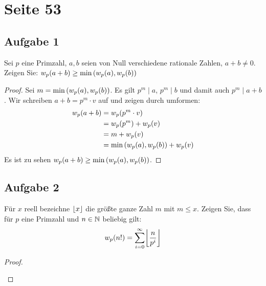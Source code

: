 \section{Seite 53}

\subsection{Aufgabe 1}
Sei $p$ eine Primzahl, $a,b$ seien von Null verschiedene rationale Zahlen,
$a + b \neq 0$. Zeigen Sie: $w_p(a + b) \geq \min{(w_p(a), w_p(b))}$
\begin{proof}
  Sei $m = \min{(w_p(a), w_p(b))}$. Es gilt $p^m \mid a$, $p^m \mid b$
  und damit auch $p^m \mid a + b$. Wir schreiben $a + b = p^m \cdot v$
  auf und zeigen durch umformen:
  \begin{align*}
    w_p(a + b) & = w_p(p^m \cdot v)                              \\
                      & = w_p(p^m) + w_p(v)                      \\
                      & = m + w_p(v)                                    \\
                      & = \min{(w_p(a), w_p(b))} + w_p(v)
  \end{align*}
  Es ist zu sehen $w_p(a + b) \geq \min{(w_p(a), w_p(b))}$.
\end{proof}

\newpage
\subsection{Aufgabe 2}
Für $x$ reell bezeichne $\lfloor x\rfloor$ die größte ganze Zahl $m$ mit $m \leq x$.
Zeigen Sie, dass für $p$ eine Primzahl und $n \in \mathbb{N}$ beliebig gilt:
\begin{equation*}
  \fvielfach{n!} = \sum_{i=0}^{\infty} \floor*{\frac{n}{p^i}}
\end{equation*}
\begin{proof}
  \begin{figure}
    \centering
  \end{figure}
\end{proof}
